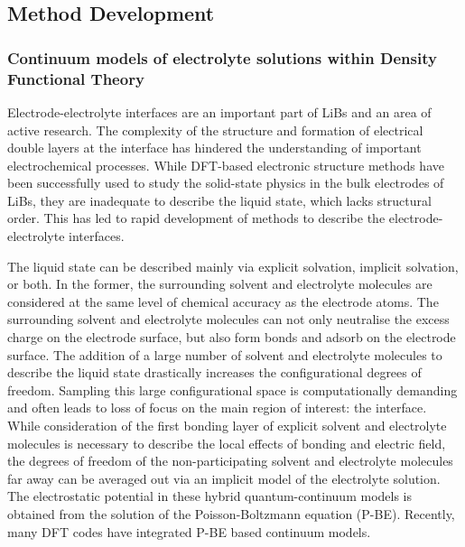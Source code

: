 \documentclass[../main.tex]{subfiles}
\begin{document}
\subsection{Method Development}

\subsubsection{Continuum models of electrolyte solutions within Density Functional Theory}
\label{sec:dft+cont}
Electrode-electrolyte interfaces are an important part of LiBs and an area of active research.\cite{Gauthier2015, yu2018electrode} The complexity of the structure and formation of electrical double layers at the interface has hindered the understanding of important electrochemical processes. While DFT-based electronic structure methods have been successfully used to study the solid-state physics in the bulk electrodes of LiBs, they are inadequate to describe the liquid state, which lacks structural order. This has led to rapid development of methods to describe the electrode-electrolyte interfaces.\cite{Jinnouchi2018} 

The liquid state can be described mainly via explicit solvation,\cite{Hansen2016} implicit solvation,\cite{Sakong2015} or both.\cite{Skyner2015} In the former, the surrounding solvent and electrolyte molecules are considered at the same level of chemical accuracy as the electrode atoms. The surrounding solvent and electrolyte molecules can not only neutralise the excess charge on the electrode surface, but also form bonds and adsorb on the electrode surface.\cite{Kang2011,Dufils2019, Jorn2013} The addition of a large number of solvent and electrolyte molecules to describe the liquid state drastically increases the configurational degrees of freedom. Sampling this large configurational space is computationally demanding and often leads to loss of focus on the main region of interest: the interface. While consideration of the first bonding layer of explicit solvent and electrolyte molecules is necessary to describe the local effects of bonding and electric field,\cite{Zhang2020} the degrees of freedom of the non-participating solvent and electrolyte molecules far away can be averaged out via an implicit model of the electrolyte solution.\cite{Cramer1999, Tomasi2005} The electrostatic potential in these hybrid quantum-continuum models is obtained from the solution of the Poisson-Boltzmann equation (P-BE).\cite{Grochowski2008} Recently, many DFT codes have integrated P-BE based continuum models.\cite{Jinnouchi2008, Gunceler2013, Ringe2016, Nattino2019, Melander2019, Stein2019, DLMG2018, Dziedzic2020, neutralization-paper}
\end{document}

